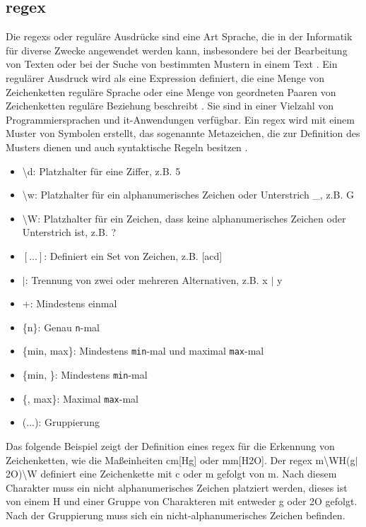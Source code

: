 \subsection{\acs{regex}} \label{sec:regex}
Die \acfp{regex} oder reguläre Ausdrücke sind eine Art Sprache, die in der Informatik für diverse Zwecke angewendet werden kann, insbesondere bei der Bearbeitung von Texten oder bei der Suche von bestimmten Mustern in einem Text \cite{regexconf}. Ein regulärer Ausdruck wird als eine Expression definiert, die eine Menge von Zeichenketten \glqq reguläre Sprache\grqq{} oder eine Menge von geordneten Paaren von Zeichenketten \glqq reguläre Beziehung\grqq{} beschreibt \cite{regexhandbook}. Sie sind in einer Vielzahl von Programmiersprachen und \ac{it}-Anwendungen verfügbar. Ein \ac{regex} wird mit einem Muster von Symbolen erstellt, das sogenannte Metazeichen, die zur Definition des Musters dienen und auch syntaktische Regeln besitzen \cite{regexweb1}.

\begin{itemize}
	\item \textbackslash d: Platzhalter für eine Ziffer, z.B. 5
	\item \textbackslash w: Platzhalter für ein alphanumerisches Zeichen oder Unterstrich \glqq\_\grqq{}, z.B. G
	\item \textbackslash W: Platzhalter für ein Zeichen, dass keine alphanumerisches Zeichen oder Unterstrich ist, z.B. ?
	\item $[...]$: Definiert ein Set von Zeichen, z.B.  [acd]
	\item $\vert$:  Trennung von zwei oder mehreren Alternativen, z.B. x $\vert$ y
	\item +: Mindestens einmal
	\item \{n\}: Genau \texttt{n}-mal
	\item \{min, max\}: Mindestens \texttt{min}-mal und maximal \texttt{max}-mal	
	\item \{min, \}: Mindestens \texttt{min}-mal
	\item \{, max\}: Maximal \texttt{max}-mal
	\item (...): Gruppierung
\end{itemize}

Das folgende Beispiel zeigt der Definition eines \ac{regex} für die Erkennung von Zeichenketten, wie die Maßeinheiten cm[Hg] oder mm[H2O]. Der \ac{regex} \glqq[cm]m\textbackslash WH(g$\vert$2O)\textbackslash W\grqq{} definiert eine Zeichenkette mit \glqq c\grqq{} oder \glqq m\grqq{} gefolgt von \glqq m\grqq{}. Nach diesem Charakter muss ein nicht alphanumerisches Zeichen platziert werden, dieses ist von einem \glqq H\grqq{} und einer Gruppe von Charakteren mit entweder \glqq g\grqq{} oder \glqq 2O\grqq{} gefolgt. Nach der Gruppierung muss sich ein nicht-alphanumerisches Zeichen befinden. 
